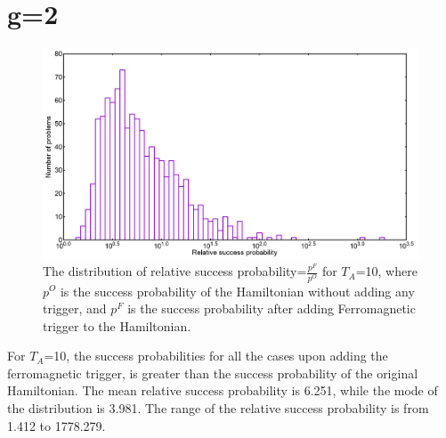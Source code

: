 \documentclass[12]{article}
\begin{document}
\section*{g=2}
\begin{figure}[H]
\centering 
\includegraphics[scale=0.3]{Hist_s12_T10_g2.png}
\caption{The distribution of relative success probability=$\frac{p^F}{p^O}$ for $T_A$=10, where $p^O$ is the success probability of the Hamiltonian without adding any trigger, and $p^F$ is the success probability after adding Ferromagnetic trigger to the Hamiltonian.}
\label{fig:f4}
\end{figure}
For $T_A$=10, the success probabilities for all the cases upon adding the ferromagnetic trigger, is greater than the success probability of the original Hamiltonian. The mean relative success probability is 6.251, while the mode of the distribution is 3.981. The range of the relative success probability is from 1.412 to 1778.279. 
\end{document}
